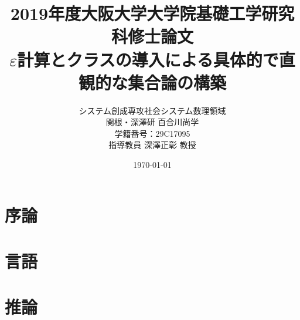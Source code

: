 \documentclass[a4j,10.5pt,oneside,openany,report]{jsbook}
\title{2019年度大阪大学大学院基礎工学研究科修士論文 \\[1cm]
$\varepsilon$計算とクラスの導入による具体的で直観的な集合論の構築 \\[7cm]}%
\author{システム創成専攻社会システム数理領域 \\ 関根・深澤研 百合川尚学 \\ 
学籍番号：29C17095 \\ 指導教員 深澤正彰 教授}
\date{\today}
\theoremstyle{mystyle}
\begin{document}
\maketitle
\tableofcontents

%
\chapter{序論}
	

\chapter{言語}
\label{chap:languages}
	
	
	
	
	
	
	
	
	

\chapter{推論}
\label{chap:inference}
	
	
	
	
%	
\end{document}
